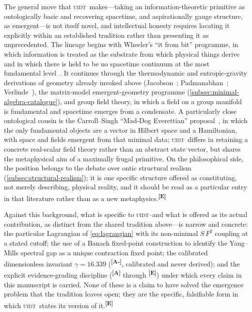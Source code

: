 \documentclass[12pt,a4paper,twoside]{article}
\theoremstyle{plain}
\theoremstyle{definition}
\theoremstyle{remark}
\newcommand{\UIDT}{\textsc{uidt}}
\newcommand{\catmark}[1]{\textsuperscript{\textsf{\textbf{[#1]}}}}
\newcommand{\GammaGeom}{16.339} %
\begin{document}
The general move that \UIDT\ makes---taking an information-theoretic primitive as ontologically basic and recovering spacetime, and aspirationally gauge structure, as emergent---is not itself novel, and intellectual honesty requires locating it explicitly within an established tradition rather than presenting it as unprecedented. The lineage begins with Wheeler's ``it from bit'' programme, in which information is treated as the substrate from which physical things derive and in which there is held to be no spacetime continuum at the most fundamental level~\cite{wheeler1990}. It continues through the thermodynamic and entropic-gravity derivations of geometry already invoked above (Jacobson~\cite{jacobson1995}; Padmanabhan~\cite{padmanabhan2010}; Verlinde~\cite{verlinde2011}), the matrix-model emergent-geometry programme (\cref{subsec:minimal-algebra-catalogue}), and group field theory, in which a field on a group manifold is fundamental and spacetime emerges from a condensate. A particularly close ontological cousin is the Carroll--Singh ``Mad-Dog Everettian'' proposal~\cite{carrollsingh2018}, in which the only fundamental objects are a vector in Hilbert space and a Hamiltonian, with space and fields emergent from that minimal data; \UIDT\ differs in retaining a concrete real-scalar field theory rather than an abstract state vector, but shares the metaphysical aim of a maximally frugal primitive. On the philosophical side, the position belongs to the debate over ontic structural realism (\cref{subsec:structural-realism}); it is one specific structure offered as constituting, not merely describing, physical reality, and it should be read as a particular entry in that literature rather than as a new metaphysics.\catmark{E}

Against this background, what is specific to \UIDT\---and what is offered as its actual contribution, as distinct from the shared tradition above---is narrow and concrete: the particular Lagrangian of \cref{eq:lagrangian} with its non-minimal $S\,F^2$ coupling at a stated cutoff; the use of a Banach fixed-point construction to identify the Yang--Mills spectral gap as a unique contraction fixed point; the calibrated dimensionless invariant $\gamma = \GammaGeom$ (\catmark{A-}, calibrated and never derived); and the explicit evidence-grading discipline (\catmark{A} through \catmark{E}) under which every claim in this manuscript is carried. None of these is a claim to have solved the emergence problem that the tradition leaves open; they are the specific, falsifiable form in which \UIDT\ states its version of it.\catmark{E}
\end{document}

